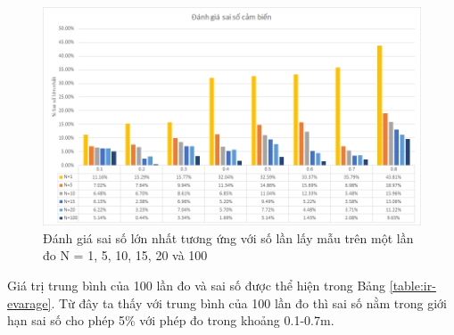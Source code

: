 {\begin{figure}[htbp]
    \centering
    \includegraphics[width=\textwidth]{figures/chart_IReval_MaxPercent.png}
    \caption[Đánh giá sai số lớn nhất tương ứng với số lần lấy mẫu]{Đánh giá sai số lớn nhất tương ứng với số lần lấy mẫu trên một lần đo N = 1, 5, 10, 15, 20 và 100}
    \label{chart:IR-eval-NumSample}
\end{figure}

 Giá trị trung bình của 100 lần đo và sai số được thể hiện trong Bảng \ref{table:ir-evarage}. Từ đây ta thấy với trung bình của 100 lần đo thì sai số nằm trong giới hạn sai số cho phép 5\% với phép đo trong khoảng 0.1-0.7m.

}

